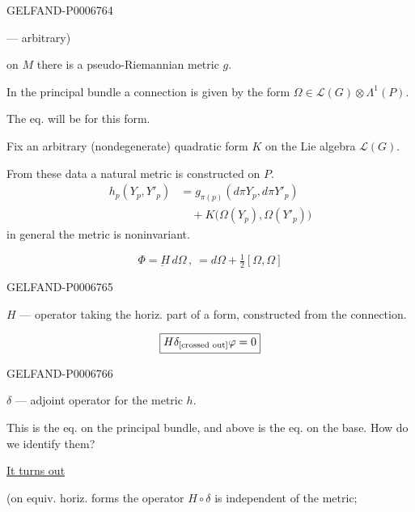 \begin{GelfandAdjacentEvidence}{GELFAND-P000676}{4}

--- arbitrary)

on \(M\) there is a pseudo-Riemannian metric \(g\).

In the principal bundle a connection is given by the form \(\Omega\in\mathcal L(G)\otimes\Lambda^1(P)\).

The eq. will be for this form.

Fix an arbitrary (nondegenerate) quadratic form \(K\) on the Lie algebra \(\mathcal L(G)\).

From these data a natural metric is constructed on \(P\).
\[
\begin{aligned}
h_p(Y_p,Y'_p)
&=g_{\pi(p)}(d\pi Y_p,d\pi Y'_p)\\
&\quad+K\bigl(\Omega(Y_p),\Omega(Y'_p)\bigr)
\end{aligned}
\]
in general the metric is noninvariant.

\[
\underline{\Phi=H\,d\Omega}\,,\ =d\Omega+\tfrac12[\Omega,\Omega]
\]
\end{GelfandAdjacentEvidence}
\begin{GelfandAdjacentEvidence}{GELFAND-P000676}{5}

\(H\) --- operator taking the horiz. part of a form, constructed from the connection.

\[
\boxed{H\delta_{\text{\scriptsize[crossed out]}}\varphi=0}
\]
\end{GelfandAdjacentEvidence}
\begin{GelfandAdjacentEvidence}{GELFAND-P000676}{6}

\(\delta\) --- adjoint operator for the metric \(h\).

This is the eq. on the principal bundle, and above is the eq. on the base. How do we identify them?

\underline{It turns out} 
\end{GelfandAdjacentEvidence}


(on equiv. horiz. forms the operator \(H\circ\delta\) is independent of the metric;

